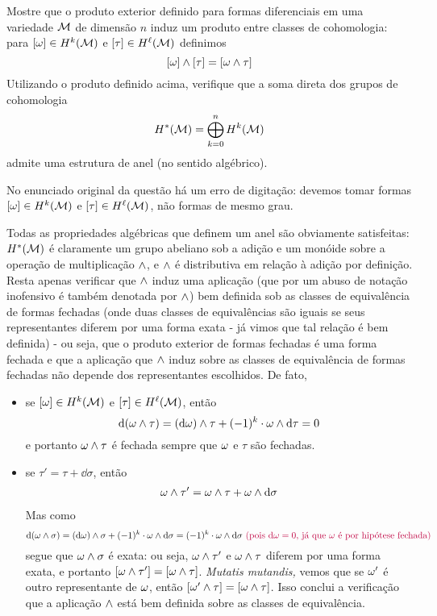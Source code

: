 \begin{Mybox}
Mostre que o produto exterior definido para formas diferenciais em uma variedade $\mathcal{M}$ de dimensão $n$ induz um produto entre classes de cohomologia: para $[\omega] \in H^k(\mathcal{M})$ e $[\tau] \in H^{\ell}(\mathcal{M})$ definimos
\[
[\omega] \wedge [\tau] = [\omega \wedge \tau]
\]
Utilizando o produto definido acima, verifique que a soma direta dos grupos de cohomologia
\[
H^{\ast}(\mathcal{M}) = \bigoplus_{k = 0}^{n} H^k(\mathcal{M})
\]
admite uma estrutura de anel (no sentido algébrico).
\vspace{-.4cm}
\end{Mybox}
\vspace{-.4cm}

\begin{oobs}
No enunciado original da questão há um erro de digitação: devemos tomar formas $[\omega] \in H^k(\mathcal{M})$ e $[\tau] \in H^{\ell}(\mathcal{M})$, não formas de mesmo grau.
\end{oobs}

\begin{dem}
Todas as propriedades algébricas que definem um anel são obviamente satisfeitas: $H^{\ast}(\mathcal{M})$ é claramente um grupo abeliano sob a adição e um monóide sobre a operação de multiplicação $\wedge$, e $\wedge$ é distributiva em relação à adição por definição. Resta apenas verificar que $\wedge$ induz uma aplicação (que por um abuso de notação inofensivo é também denotada por $\wedge$) bem definida sob as classes de equivalência de formas fechadas (onde duas classes de equivalências são iguais se seus representantes diferem por uma forma exata - já vimos que tal relação é bem definida) - ou seja, que o produto exterior de formas fechadas é uma forma fechada e que a aplicação que $\wedge$ induz sobre as classes de equivalência de formas fechadas não depende dos representantes escolhidos. De fato, 
\begin{itemize}
\item se $[\omega] \in H^k(\mathcal{M})$ e $[\tau] \in H^{\ell}(\mathcal{M})$, então
\[
\mathrm{d}(\omega \wedge \tau) = (\mathrm{d} \omega) \wedge \tau + (-1)^k  \cdot\omega \wedge \mathrm{d} \tau = 0
\]
e portanto $\omega \wedge \tau$ é fechada sempre que $\omega$ e $\tau$ são fechadas.
\item se $\tau' = \tau + \dd \sigma$, então 
\begin{align*}
\omega \wedge \tau' = \omega \wedge \tau + \omega \wedge \mathrm{d} \sigma 
\end{align*}
Mas como
\[
\mathrm{d}(\omega \wedge \sigma) = (\mathrm{d} \omega) \wedge \sigma + (-1)^k \cdot \omega \wedge \mathrm{d} \sigma = (-1)^k \cdot \omega \wedge \mathrm{d} \sigma \textcolor{purple}{\text{ (pois } \mathrm{d} \omega = 0 \text{, já que $\omega$ é por hipótese fechada)}}
\]
segue que $\omega \wedge \sigma$ é exata: ou seja, $\omega \wedge \tau' $ e $\omega \wedge \tau $ diferem por uma forma exata, e portanto $[\omega \wedge \tau'] = [\omega \wedge \tau]$. \emph{Mutatis mutandis, } vemos que se $\omega'$ é outro representante de $\omega$, então $[\omega' \wedge \tau] = [\omega \wedge \tau]$. Isso conclui a verificação que a aplicação $\wedge$ está bem definida sobre as classes de equivalência.
\end{itemize} 
\end{dem}


